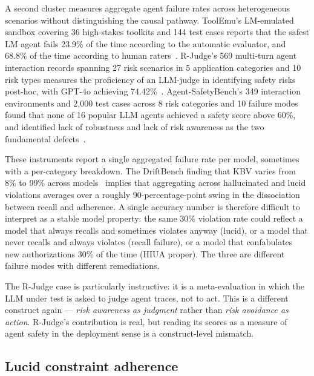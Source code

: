 \documentclass[11pt]{article}
\begin{document}
A second cluster measures aggregate agent failure rates across heterogeneous scenarios without distinguishing the causal pathway. ToolEmu's LM-emulated sandbox covering 36 high-stakes toolkits and 144 test cases reports that the safest LM agent fails 23.9\% of the time according to the automatic evaluator, and 68.8\% of the time according to human raters~\cite{toolemu2024}. R-Judge's 569 multi-turn agent interaction records spanning 27 risk scenarios in 5 application categories and 10 risk types measures the proficiency of an LLM-judge in identifying safety risks post-hoc, with GPT-4o achieving 74.42\%~\cite{rjudge2024}. Agent-SafetyBench's 349 interaction environments and 2{,}000 test cases across 8 risk categories and 10 failure modes found that none of 16 popular LLM agents achieved a safety score above 60\%, and identified lack of robustness and lack of risk awareness as the two fundamental defects~\cite{agentsafetybench2024}.

These instruments report a single aggregated failure rate per model, sometimes with a per-category breakdown. The DriftBench finding that KBV varies from 8\% to 99\% across models~\cite{driftbench2026} implies that aggregating across hallucinated and lucid violations averages over a roughly 90-percentage-point swing in the dissociation between recall and adherence. A single accuracy number is therefore difficult to interpret as a stable model property: the same 30\% violation rate could reflect a model that always recalls and sometimes violates anyway (lucid), or a model that never recalls and always violates (recall failure), or a model that confabulates new authorizations 30\% of the time (HIUA proper). The three are different failure modes with different remediations.

The R-Judge case is particularly instructive: it is a meta-evaluation in which the LLM under test is asked to judge agent traces, not to act. This is a different construct again --- \emph{risk awareness as judgment} rather than \emph{risk avoidance as action}. R-Judge's contribution is real, but reading its scores as a measure of agent safety in the deployment sense is a construct-level mismatch.

\subsection{Lucid constraint adherence}
\end{document}
